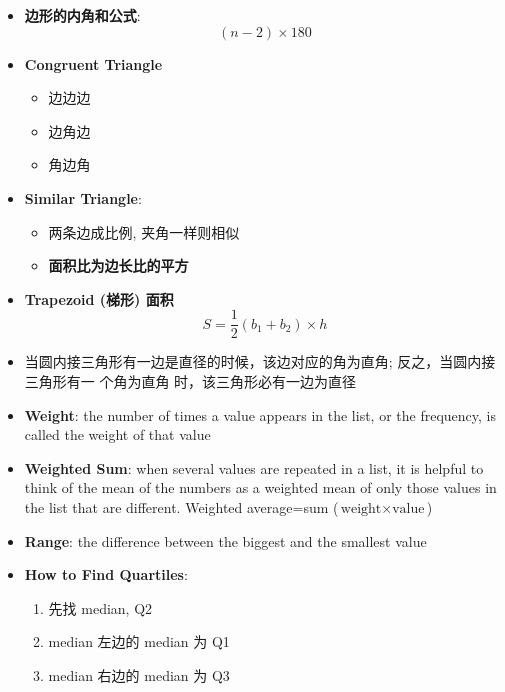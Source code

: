 \begin{multicols}{2}
\begin{itemize}
    \item \textbf{边形的内角和公式}:
    \begin{equation}
      \left( n - 2 \right) \times 180
    \end{equation}

    \item \textbf{Congruent Triangle}
    \begin{itemize}
      \item 边边边
      \item 边角边
      \item 角边角
    \end{itemize}

    \item \textbf{Similar Triangle}:
    \begin{itemize}
      \item 两条边成比例, 夹角一样则相似
      \item \textbf{面积比为边长比的平方}
    \end{itemize}

    \item \textbf{Trapezoid (梯形) 面积}
    \begin{equation}
      S = \frac{1}{2}\left( b_{1} + b_{2} \right) \times h
    \end{equation}

    \item 当圆内接三角形有一边是直径的时候，该边对应的角为直角; 反之，当圆内接三角形有一
    个角为直角 时，该三角形必有一边为直径

    \item \textbf{Weight}: the number of times a value appears in the list,
    or the frequency, is called the weight of that value

    \item \textbf{Weighted Sum}: when several values are repeated in a list,
    it is helpful to think of the mean of the numbers as a weighted mean of
    only those values in the list that are different. Weighted average=sum
    ($ \text{weight} \times \text{value} $)

    \item \textbf{Range}: the difference between the biggest and the smallest
    value

    \item \textbf{How to Find Quartiles}:
    \begin{enumerate}
      \item 先找 median, Q2
      \item median 左边的 median 为 Q1
      \item median 右边的 median 为 Q3
    \end{enumerate}


\end{itemize}
\end{multicols}
